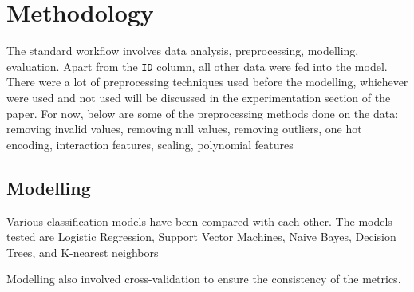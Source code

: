 \section{Methodology}


The standard workflow involves data analysis, preprocessing, modelling, evaluation. Apart from the \texttt{ID} column, all other data were fed into the model. There were a lot of preprocessing techniques used before the modelling, whichever were used and not used will be discussed in the experimentation section of the paper. For now, below are some of the preprocessing methods done on the data:
removing invalid values, removing null values, removing outliers, one hot encoding, interaction features, scaling, polynomial features


\subsection{Modelling}

Various classification models have been compared with each other. The models tested are Logistic Regression, Support Vector Machines, Naive Bayes, Decision Trees, and K-nearest neighbors

Modelling also involved cross-validation to ensure the consistency of the metrics.
